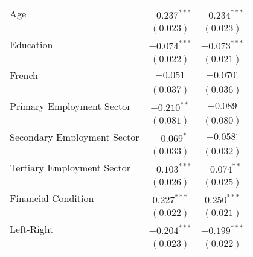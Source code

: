 \begin{center}
\begin{tiny}
\begin{longtable}{l@{} c@{} c@{}}
\quad Age                                                                            & $-0.237^{***}$   & $-0.234^{***}$   \\
                                                                                     & $(0.023)$        & $(0.023)$        \\
\quad Education                                                                      & $-0.074^{***}$   & $-0.073^{***}$   \\
                                                                                     & $(0.022)$        & $(0.021)$        \\
\quad French                                                                         & $-0.051$         & $-0.070^{\cdot}$ \\
                                                                                     & $(0.037)$        & $(0.036)$        \\
\quad Primary Employment Sector                                                      & $-0.210^{**}$    & $-0.089$         \\
                                                                                     & $(0.081)$        & $(0.080)$        \\
\quad Secondary Employment Sector                                                    & $-0.069^{*}$     & $-0.058^{\cdot}$ \\
                                                                                     & $(0.033)$        & $(0.032)$        \\
\quad Tertiary Employment Sector                                                     & $-0.103^{***}$   & $-0.074^{**}$    \\
                                                                                     & $(0.026)$        & $(0.025)$        \\
\quad Financial Condition                                                            & $0.227^{***}$    & $0.250^{***}$    \\
                                                                                     & $(0.022)$        & $(0.021)$        \\
\quad Left-Right                                                                     & $-0.204^{***}$   & $-0.199^{***}$   \\
                                                                                     & $(0.023)$        & $(0.022)$        \\

\end{longtable}
\end{tiny}
\end{center}
